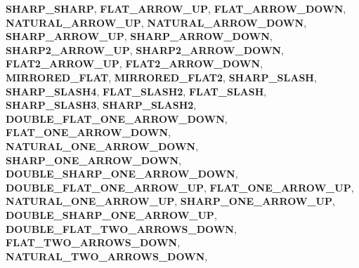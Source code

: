 \begin{DoxyCompactItemize}
\newline
{\bfseries S\+H\+A\+R\+P\+\_\+\+S\+H\+A\+RP}, 
{\bfseries F\+L\+A\+T\+\_\+\+A\+R\+R\+O\+W\+\_\+\+UP}, 
{\bfseries F\+L\+A\+T\+\_\+\+A\+R\+R\+O\+W\+\_\+\+D\+O\+WN}, 
{\bfseries N\+A\+T\+U\+R\+A\+L\+\_\+\+A\+R\+R\+O\+W\+\_\+\+UP}, 
\newline
{\bfseries N\+A\+T\+U\+R\+A\+L\+\_\+\+A\+R\+R\+O\+W\+\_\+\+D\+O\+WN}, 
{\bfseries S\+H\+A\+R\+P\+\_\+\+A\+R\+R\+O\+W\+\_\+\+UP}, 
{\bfseries S\+H\+A\+R\+P\+\_\+\+A\+R\+R\+O\+W\+\_\+\+D\+O\+WN}, 
{\bfseries S\+H\+A\+R\+P2\+\_\+\+A\+R\+R\+O\+W\+\_\+\+UP}, 
\newline
{\bfseries S\+H\+A\+R\+P2\+\_\+\+A\+R\+R\+O\+W\+\_\+\+D\+O\+WN}, 
{\bfseries F\+L\+A\+T2\+\_\+\+A\+R\+R\+O\+W\+\_\+\+UP}, 
{\bfseries F\+L\+A\+T2\+\_\+\+A\+R\+R\+O\+W\+\_\+\+D\+O\+WN}, 
{\bfseries M\+I\+R\+R\+O\+R\+E\+D\+\_\+\+F\+L\+AT}, 
\newline
{\bfseries M\+I\+R\+R\+O\+R\+E\+D\+\_\+\+F\+L\+A\+T2}, 
{\bfseries S\+H\+A\+R\+P\+\_\+\+S\+L\+A\+SH}, 
{\bfseries S\+H\+A\+R\+P\+\_\+\+S\+L\+A\+S\+H4}, 
{\bfseries F\+L\+A\+T\+\_\+\+S\+L\+A\+S\+H2}, 
\newline
{\bfseries F\+L\+A\+T\+\_\+\+S\+L\+A\+SH}, 
{\bfseries S\+H\+A\+R\+P\+\_\+\+S\+L\+A\+S\+H3}, 
{\bfseries S\+H\+A\+R\+P\+\_\+\+S\+L\+A\+S\+H2}, 
{\bfseries D\+O\+U\+B\+L\+E\+\_\+\+F\+L\+A\+T\+\_\+\+O\+N\+E\+\_\+\+A\+R\+R\+O\+W\+\_\+\+D\+O\+WN}, 
\newline
{\bfseries F\+L\+A\+T\+\_\+\+O\+N\+E\+\_\+\+A\+R\+R\+O\+W\+\_\+\+D\+O\+WN}, 
{\bfseries N\+A\+T\+U\+R\+A\+L\+\_\+\+O\+N\+E\+\_\+\+A\+R\+R\+O\+W\+\_\+\+D\+O\+WN}, 
{\bfseries S\+H\+A\+R\+P\+\_\+\+O\+N\+E\+\_\+\+A\+R\+R\+O\+W\+\_\+\+D\+O\+WN}, 
{\bfseries D\+O\+U\+B\+L\+E\+\_\+\+S\+H\+A\+R\+P\+\_\+\+O\+N\+E\+\_\+\+A\+R\+R\+O\+W\+\_\+\+D\+O\+WN}, 
\newline
{\bfseries D\+O\+U\+B\+L\+E\+\_\+\+F\+L\+A\+T\+\_\+\+O\+N\+E\+\_\+\+A\+R\+R\+O\+W\+\_\+\+UP}, 
{\bfseries F\+L\+A\+T\+\_\+\+O\+N\+E\+\_\+\+A\+R\+R\+O\+W\+\_\+\+UP}, 
{\bfseries N\+A\+T\+U\+R\+A\+L\+\_\+\+O\+N\+E\+\_\+\+A\+R\+R\+O\+W\+\_\+\+UP}, 
{\bfseries S\+H\+A\+R\+P\+\_\+\+O\+N\+E\+\_\+\+A\+R\+R\+O\+W\+\_\+\+UP}, 
\newline
{\bfseries D\+O\+U\+B\+L\+E\+\_\+\+S\+H\+A\+R\+P\+\_\+\+O\+N\+E\+\_\+\+A\+R\+R\+O\+W\+\_\+\+UP}, 
{\bfseries D\+O\+U\+B\+L\+E\+\_\+\+F\+L\+A\+T\+\_\+\+T\+W\+O\+\_\+\+A\+R\+R\+O\+W\+S\+\_\+\+D\+O\+WN}, 
{\bfseries F\+L\+A\+T\+\_\+\+T\+W\+O\+\_\+\+A\+R\+R\+O\+W\+S\+\_\+\+D\+O\+WN}, 
{\bfseries N\+A\+T\+U\+R\+A\+L\+\_\+\+T\+W\+O\+\_\+\+A\+R\+R\+O\+W\+S\+\_\+\+D\+O\+WN}, 
\newline

\end{DoxyCompactItemize}
